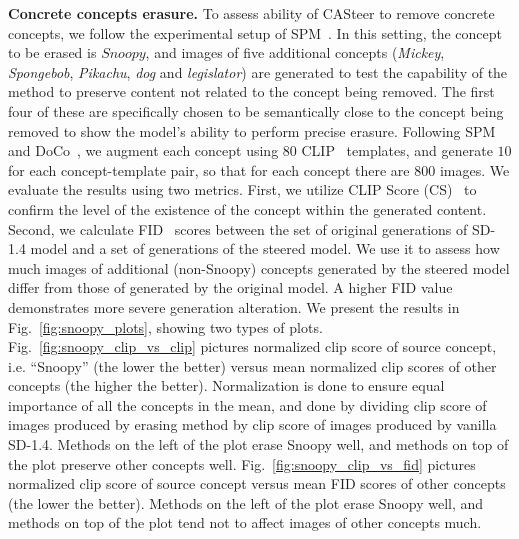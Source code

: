 \noindent \textbf{Concrete concepts erasure.}
To assess ability of CASteer to remove concrete concepts, we follow the experimental setup of SPM~\cite{DBLP:conf/cvpr/Lyu0HCJ00HD24}.
%
In this setting, the concept to be erased is $\textit{Snoopy}$, and images of five additional concepts (\textit{Mickey}, \textit{Spongebob}, \textit{Pikachu}, \textit{dog} and \textit{legislator}) are generated to test the capability of the method to preserve content not related to the concept being removed.
The first four of these are specifically chosen to be semantically close to the concept being removed to show the model's ability to perform precise erasure. 
%
Following SPM~\cite{DBLP:conf/cvpr/Lyu0HCJ00HD24} and DoCo~\cite{wu2025unlearning}, we augment each concept using $80 $ CLIP~\cite{DBLP:conf/icml/RadfordKHRGASAM21} templates, and generate $10$ for each concept-template pair, so that for each concept there are $800$ images. 
%
%
We evaluate the results using two metrics. First, we utilize CLIP Score (CS)~\cite{DBLP:conf/emnlp/HesselHFBC21} to confirm the level of the existence of the concept within the generated content. 
%
Second, we calculate FID~\cite{DBLP:conf/nips/HeuselRUNH17} scores between the set of original generations of SD-1.4 model and a set of generations of the steered model. We use it to assess how much images of additional (non-Snoopy) concepts generated by the steered model differ from those of generated by the original model. A higher FID value demonstrates more severe generation alteration. 
%
We present the results in Fig.~\ref{fig:snoopy_plots}, showing two types of plots. Fig.~\ref{fig:snoopy_clip_vs_clip} pictures normalized clip score of source concept, i.e. ``Snoopy'' (the lower the better) versus mean normalized clip scores of other concepts (the higher the better). Normalization is done to ensure equal importance of all the concepts in the mean, and done by dividing clip score of images produced by erasing method by clip score of images produced by vanilla SD-1.4. 
Methods on the left of the plot erase Snoopy well, and methods on top of the plot preserve other concepts well. 
Fig.~\ref{fig:snoopy_clip_vs_fid} pictures normalized clip score of source concept versus mean FID scores of other concepts (the lower the better). 
Methods on the left of the plot erase Snoopy well, and methods on top of the plot tend not to affect images of other concepts much. \\
